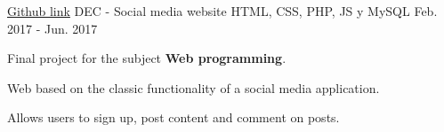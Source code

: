 \begin{cventries}
  \cventry
    {\href{https://github.com/matl1995/PW}{Github link}} %
    {DEC - Social media website} %
    {HTML, CSS, PHP, JS y MySQL} %
    {Feb. 2017 - Jun. 2017} %
    {
      \begin{cvitems} %
        \item {Final project for the subject \textbf{Web programming}.}
        \item {Web based on the classic functionality of a social media application.}
        \item {Allows users to sign up, post content and comment on posts.}
      \end{cvitems}
    }

\end{cventries}
